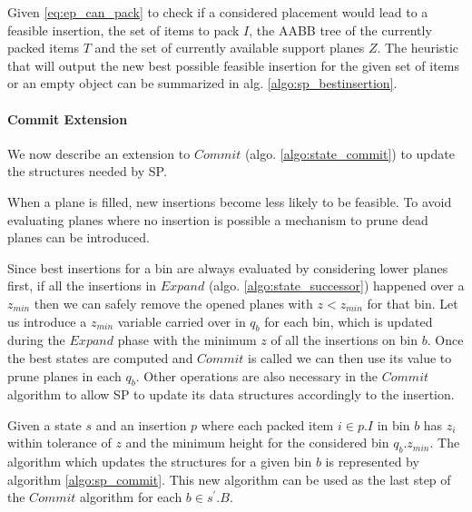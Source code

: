 Given \cref{eq:ep_can_pack} to check if a considered placement would lead to a feasible insertion, the set of items to pack $I$, the AABB tree of the currently packed items $T$ and the set of currently available support planes $Z$.
The heuristic that will output the new best possible feasible insertion for the given set of items or an empty object can be summarized in alg. \ref{algo:sp_bestinsertion}. 




\paragraph*{Commit Extension}
We now describe an extension to $Commit$ (algo. \ref{algo:state_commit}) to update the structures needed by SP.

When a plane is filled, new insertions become less likely to be feasible. 
To avoid evaluating planes where no insertion is possible a mechanism to prune dead planes can be introduced.

Since best insertions for a bin are always evaluated by considering lower planes first, if all the insertions in $Expand$ (algo. \ref{algo:state_successor}) happened over a $z_{min}$ then we can safely remove the opened planes with $z < z_{min}$ for that bin.
Let us introduce a $z_{min}$ variable carried over in $q_b$ for each bin, which is updated during the $Expand$ phase with the minimum $z$ of all the insertions on bin $b$.
Once the best states are computed and $Commit$ is called we can then use its value to prune planes in each $q_b$.
Other operations are also necessary in the $Commit$ algorithm to allow SP to update its data structures accordingly to the insertion.

Given a state $s$ and an insertion $p$ where each packed item $i \in p.I$ in bin $b$ has $z_i$ within tolerance of $z$ and the minimum height for the considered bin $q_b.z_{min}$.
The algorithm which updates the structures for a given bin $b$ is represented by algorithm \ref{algo:sp_commit}.
This new algorithm can be used as the last step of the $Commit$ algorithm for each $b \in s^\prime.B$.



